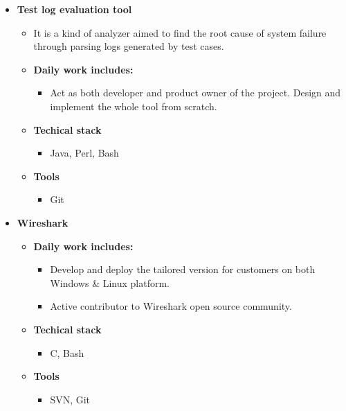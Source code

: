 \documentclass[11pt,a4paper,sans]{moderncv}        %
\begin{document}
{\begin{itemize}
\begin{itemize}
       \begin{itemize}
       \item Git, Jenkins
       \end{itemize}
   \end{itemize}
\item \textbf{Test log evaluation tool}
    \begin{itemize}
    \item It is a kind of analyzer aimed to find the root cause of system failure through parsing logs generated by test cases.
    \item \textbf{Daily work includes:}
        \begin{itemize}
        \item Act as both developer and product owner of the project. Design and implement the whole tool from scratch.
        \end{itemize}
    \item \textbf{Techical stack}
        \begin{itemize}
        \item Java, Perl, Bash
        \end{itemize}
    \item \textbf{Tools}
        \begin{itemize}
        \item Git
        \end{itemize}
    \end{itemize}
\item \textbf{Wireshark}
    \begin{itemize}
    \item \textbf{Daily work includes:}
        \begin{itemize}
            \item Develop and deploy the tailored version for customers on both Windows \& Linux platform.
            \item Active contributor to Wireshark open source community.
        \end{itemize}
    \item \textbf{Techical stack}
        \begin{itemize}
        \item C, Bash
        \end{itemize}
    \item \textbf{Tools}
        \begin{itemize}
        \item SVN, Git
        \end{itemize}
    \end{itemize}
\end{itemize}}

\clearpage
\end{document}

